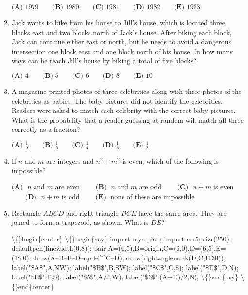 \documentclass{article}
\begin{document}
\begin{enumerate}[label=\arabic*., itemsep=0.5em]
\(\textbf{(A) }1979\qquad\textbf{(B) }1980\qquad\textbf{(C) }1981\qquad\textbf{(D) }1982\qquad \textbf{(E) }1983\)\par \vspace{0.5em}\item Jack wants to bike from his house to Jill's house, which is located three blocks east and two blocks north of Jack's house. After biking each block, Jack can continue either east or north, but he needs to avoid a dangerous intersection one block east and one block north of his house. In how many ways can he reach Jill's house by biking a total of five blocks?

\( \textbf{(A) }4\qquad\textbf{(B) }5\qquad\textbf{(C) }6\qquad\textbf{(D) }8\qquad\textbf{(E) }10 \)\par \vspace{0.5em}\item A magazine printed photos of three celebrities along with three photos of the celebrities as babies. The baby pictures did not identify the celebrities. Readers were asked to match each celebrity with the correct baby pictures. What is the probability that a reader guessing at random will match all three correctly as a fraction?

\( \textbf{(A) }\frac{1}{9}\qquad\textbf{(B) }\frac{1}{6}\qquad\textbf{(C) }\frac{1}{4}\qquad\textbf{(D) }\frac{1}{3}\qquad\textbf{(E) }\frac{1}{2} \)\par \vspace{0.5em}\item If \(n\) and \(m\) are integers and \(n^2+m^2\) is even, which of the following is impossible?

\(\textbf{(A) }\) \(n\) and \(m\) are even \(\qquad\textbf{(B) }\) \(n\) and \(m\) are odd \(\qquad\textbf{(C) }\) \(n+m\) is even \(\qquad\textbf{(D) }\) \(n+m\) is odd \(\qquad \textbf{(E) }\) none of these are impossible\par \vspace{0.5em}\item Rectangle \(ABCD\) and right triangle \(DCE\) have the same area. They are joined to form a trapezoid, as shown. What is \(DE\)?


\textbackslash\{\}begin\{center\}
\textbackslash\{\}begin\{asy\}
import olympiad;
import cse5;
size(250);
defaultpen(linewidth(0.8));
pair A=(0,5),B=origin,C=(6,0),D=(6,5),E=(18,0);
draw(A--B--E--D--cycle\^{}\^{}C--D);
draw(rightanglemark(D,C,E,30));
label("\$A\$",A,NW);
label("\$B\$",B,SW);
label("\$C\$",C,S);
label("\$D\$",D,N);
label("\$E\$",E,S);
label("\$5\$",A/2,W);
label("\$6\$",(A+D)/2,N);
\textbackslash\{\}end\{asy\}
\textbackslash\{\}end\{center\}



\end{enumerate}
\end{document}
